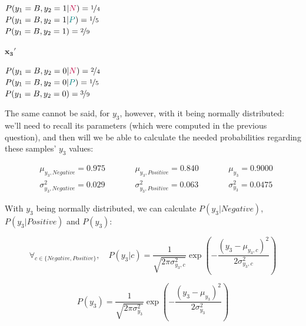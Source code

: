 \documentclass[12pt]{article}
\begin{document}
\begin{enumerate}[leftmargin=\labelsep]
\begin{multicols}{3}
          $P(y_1 = B, y_2 = 1 | \textcolor{purple}{N}) = \nicefrac{1}{4}$ \\
          $P(y_1 = B, y_2 = 1 | \textcolor{teal}{P}) = \nicefrac{1}{5}$ \\
          $P(y_1 = B, y_2 = 1) = \nicefrac{2}{9}$

          \columnbreak

          \begin{center}
            $\mathbf{x_3'}$
          \end{center}

          $P(y_1 = B, y_2 = 0 | \textcolor{purple}{N}) = \nicefrac{2}{4}$ \\
          $P(y_1 = B, y_2 = 0 | \textcolor{teal}{P}) = \nicefrac{1}{5}$ \\
          $P(y_1 = B, y_2 = 0) = \nicefrac{3}{9}$

        \end{multicols}

        The same cannot be said, for $y_3$, however, with it being normally distributed:
        we'll need to recall its parameters (which were computed in the previous question),
        and then will we be able to calculate the needed probabilities regarding
        these samples' $y_3$ values:

        $$
          \begin{aligned}
             & \mu_{y_3, Negative} = 0.975      & \qquad & \mu_{y_3, Positive} = 0.840      & \qquad & \mu_{y_3} = 0.9000      \\
             & \sigma_{y_3, Negative}^2 = 0.029 & \qquad & \sigma_{y_3, Positive}^2 = 0.063 & \qquad & \sigma_{y_3}^2 = 0.0475
          \end{aligned}
        $$

        With $y_3$ being normally distributed, we can calculate $P(y_3 | Negative)$, $P(y_3 | Positive)$ and $P(y_3)$:

        $$
          \forall_{c \in \{Negative, Positive\}},\quad P(y_3 | c) = \frac{1}{\sqrt{2 \pi \sigma_{y_3, c}^2}} \exp \left( - \frac{(y_3 - \mu_{y_3, c})^2}{2 \sigma_{y_3, c}^2} \right)
        $$

        $$
          P(y_3) = \frac{1}{\sqrt{2 \pi \sigma_{y_3}^2}} \exp \left( - \frac{(y_3 - \mu_{y_3})^2}{2 \sigma_{y_3}^2} \right)
        $$

        \begin{multicols}{3}
          \setlength{\columnseprule}{1pt}
          \def\columnseprulecolor{\color{black}}
          \centering


\end{multicols}
\end{enumerate}
\end{document}
